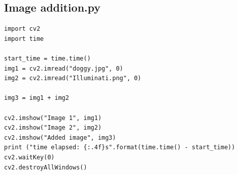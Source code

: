 \documentclass[11pt]{article}
\begin{document}
\newpage
\subsection*{Image addition.py}
\begin{lstlisting}
import cv2
import time

start_time = time.time()
img1 = cv2.imread("doggy.jpg", 0)
img2 = cv2.imread("Illuminati.png", 0)

img3 = img1 + img2

cv2.imshow("Image 1", img1)
cv2.imshow("Image 2", img2)
cv2.imshow("Added image", img3)
print ("time elapsed: {:.4f}s".format(time.time() - start_time))
cv2.waitKey(0)
cv2.destroyAllWindows()
\end{lstlisting}
\end{document}

